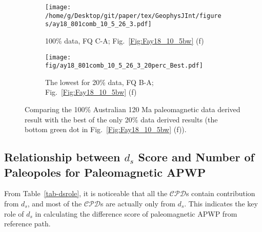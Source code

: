 \begin{figure*}[tbp]
  \captionsetup[subfigure]{labelformat=empty,aboveskip=-6pt,belowskip=-6pt}
  \centering
  \begin{subfigure}[htbp]{.49\textwidth}
    \captionsetup{skip=0pt}
    \centering
    \texttt{[image: /home/g/Desktop/git/paper/tex/GeophysJInt/figures/ay18\_801comb\_10\_5\_26\_3.pdf]}
    \caption{100\% data, FQ C-A; Fig.~\ref{Fig:Fay18_10_5bw}
    (f)}\label{Fig:Fay18_10_5w801}
  \end{subfigure}
  \begin{subfigure}[htbp]{.49\textwidth}
    \captionsetup{skip=0pt}
    \centering
    \texttt{[image: fig/ay18\_801comb\_10\_5\_26\_3\_20perc\_Best.pdf]} %
    \caption{The lowest for 20\% data, FQ B-A; Fig.~\ref{Fig:Fay18_10_5bw}
    (f)}\label{Fig:Fay18_10_5w801l20p}
  \end{subfigure}
  \caption[Less data, better similarity?]{Comparing the 100\% Australian
  120 Ma paleomagnetic data derived result with the best of the only
  20\% data derived results (the bottom green dot in Fig.~\ref{Fig:Fay18_10_5bw}
  (f)).}\label{Fig:Fay18_10_5w801l20p_vs_100p}
\end{figure*}

\subsection{Relationship between $d_s$ Score and Number of Paleopoles for
Paleomagnetic APWP}

From Table~\ref{tab-dsrole}, it is noticeable that all the $\mathcal{CPD}$s
contain contribution from $d_s$, and most of the $\mathcal{CPD}$s are actually
only from $d_s$. This indicates the key role of $d_s$ in calculating the
difference score of paleomagnetic APWP from reference path.

